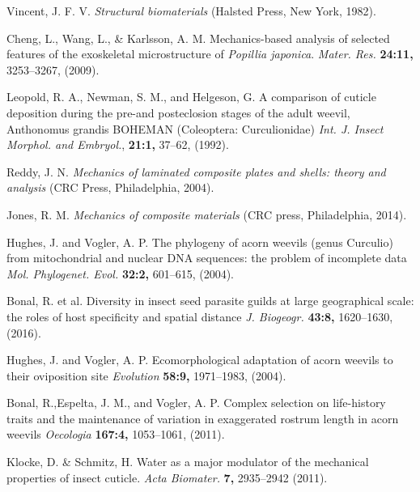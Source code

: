 \documentclass[twocolumn, linenumbers, superscriptaddress, nofootinbib]{revtex4-1}
\begin{document}
\begin{thebibliography}{50}
				Vincent, J. F. V.
				\textit{Structural biomaterials}
				(Halsted Press,
				New York,
				1982).
			
				Cheng, L., Wang, L., \& Karlsson, A. M.
				Mechanics-based analysis of selected features of the exoskeletal microstructure of \textit{Popillia japonica}.
				\textit{Mater. Res.}
				\textbf{24:11,}
				3253--3267,
				(2009).			
			
				Leopold, R. A., Newman, S. M., and Helgeson, G.
				A comparison of cuticle deposition during the pre-and posteclosion stages of the adult weevil, Anthonomus grandis BOHEMAN (Coleoptera: Curculionidae)
				\textit{Int. J. Insect Morphol. and Embryol.},
				\textbf{21:1,}
				37--62,
				(1992).
			
				Reddy, J. N.
				\textit{Mechanics of laminated composite plates and shells: theory and analysis}
				(CRC Press,
				Philadelphia,
				2004).
			
				Jones, R. M.
				\textit{Mechanics of composite materials}
				(CRC press,
				Philadelphia,
				2014).
			
				Hughes, J. and Vogler, A. P.
				The phylogeny of acorn weevils (genus Curculio) from mitochondrial and nuclear DNA sequences: the problem of incomplete data
				\textit{Mol. Phylogenet. Evol.}
				\textbf{32:2,}
				601--615,
				(2004).
				
				Bonal, R. et al.
				Diversity in insect seed parasite guilds at large geographical scale: the roles of host specificity and spatial distance
				\textit{J. Biogeogr.}
				\textbf{43:8,}
				1620--1630,
				(2016).
				
				Hughes, J. and Vogler, A. P.
				Ecomorphological adaptation of acorn weevils to their oviposition site
				\textit{Evolution}
				\textbf{58:9,}
				1971--1983,
				(2004).	
				
				Bonal, R.,Espelta, J. M., and Vogler, A. P.
				Complex selection on life-history traits and the maintenance of variation in exaggerated rostrum length in acorn weevils
				\textit{Oecologia}
				\textbf{167:4,}
				1053--1061,
				(2011).
			
				Klocke, D. \& Schmitz, H.
				Water as a major modulator of the mechanical properties of insect cuticle.
				\textit{Acta Biomater.}
				\textbf{7,}
				2935--2942
				(2011).
				

\end{thebibliography}
\end{document}
